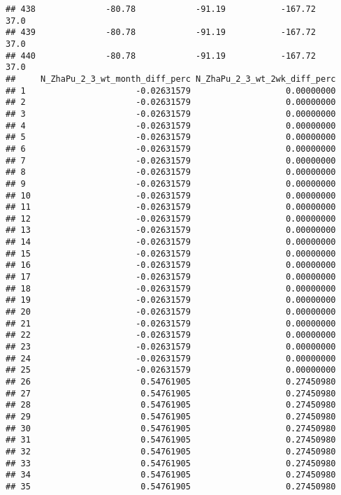 \documentclass[]{article}
\begin{document}
\begin{verbatim}
## 438              -80.78            -91.19           -167.72           37.0
## 439              -80.78            -91.19           -167.72           37.0
## 440              -80.78            -91.19           -167.72           37.0
##     N_ZhaPu_2_3_wt_month_diff_perc N_ZhaPu_2_3_wt_2wk_diff_perc
## 1                      -0.02631579                   0.00000000
## 2                      -0.02631579                   0.00000000
## 3                      -0.02631579                   0.00000000
## 4                      -0.02631579                   0.00000000
## 5                      -0.02631579                   0.00000000
## 6                      -0.02631579                   0.00000000
## 7                      -0.02631579                   0.00000000
## 8                      -0.02631579                   0.00000000
## 9                      -0.02631579                   0.00000000
## 10                     -0.02631579                   0.00000000
## 11                     -0.02631579                   0.00000000
## 12                     -0.02631579                   0.00000000
## 13                     -0.02631579                   0.00000000
## 14                     -0.02631579                   0.00000000
## 15                     -0.02631579                   0.00000000
## 16                     -0.02631579                   0.00000000
## 17                     -0.02631579                   0.00000000
## 18                     -0.02631579                   0.00000000
## 19                     -0.02631579                   0.00000000
## 20                     -0.02631579                   0.00000000
## 21                     -0.02631579                   0.00000000
## 22                     -0.02631579                   0.00000000
## 23                     -0.02631579                   0.00000000
## 24                     -0.02631579                   0.00000000
## 25                     -0.02631579                   0.00000000
## 26                      0.54761905                   0.27450980
## 27                      0.54761905                   0.27450980
## 28                      0.54761905                   0.27450980
## 29                      0.54761905                   0.27450980
## 30                      0.54761905                   0.27450980
## 31                      0.54761905                   0.27450980
## 32                      0.54761905                   0.27450980
## 33                      0.54761905                   0.27450980
## 34                      0.54761905                   0.27450980
## 35                      0.54761905                   0.27450980

\end{verbatim}
\end{document}
